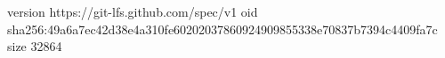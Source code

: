 version https://git-lfs.github.com/spec/v1
oid sha256:49a6a7ec42d38e4a310fe60202037860924909855338e70837b7394c4409fa7c
size 32864
